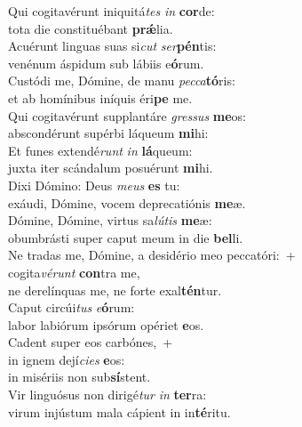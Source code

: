 \evenverse Qui cogitavérunt iniquitá\textit{tes} \textit{in} \textbf{cor}de:~\*\\
\evenverse tota die constituébant \textbf{prǽ}lia.\\
\oddverse Acuérunt linguas suas si\textit{cut} \textit{ser}\textbf{pén}tis:~\*\\
\oddverse venénum áspidum sub lábiis e\textbf{ó}rum.\\
\evenverse Custódi me, Dómine, de manu \textit{pec}\textit{ca}\textbf{tó}ris:~\*\\
\evenverse et ab homínibus iníquis éri\textbf{pe} me.\\
\oddverse Qui cogitavérunt supplantáre \textit{gres}\textit{sus} \textbf{me}os:~\*\\
\oddverse abscondérunt supérbi láqueum \textbf{mi}hi:\\
\evenverse Et funes extendé\textit{runt} \textit{in} \textbf{lá}queum:~\*\\
\evenverse juxta iter scándalum posuérunt \textbf{mi}hi.\\
\oddverse Dixi Dómino: Deus \textit{me}\textit{us} \textbf{es} tu:~\*\\
\oddverse exáudi, Dómine, vocem deprecatiónis \textbf{me}æ.\\
\evenverse Dómine, Dómine, virtus sa\textit{lú}\textit{tis} \textbf{me}æ:~\*\\
\evenverse obumbrásti super caput meum in die \textbf{bel}li.\\
\oddverse Ne tradas me, Dómine, a desidério meo peccatóri:~+\\
\oddverse  cogita\textit{vé}\textit{runt} \textbf{con}tra me,~\*\\
\oddverse ne derelínquas me, ne forte exal\textbf{tén}tur.\\
\evenverse Caput circúi\textit{tus} \textit{e}\textbf{ó}rum:~\*\\
\evenverse labor labiórum ipsórum opériet \textbf{e}os.\\
\oddverse Cadent super eos carbónes,~+\\
\oddverse  in ignem dejí\textit{ci}\textit{es} \textbf{e}os:~\*\\
\oddverse in misériis non sub\textbf{sí}stent.\\
\evenverse Vir linguósus non dirigé\textit{tur} \textit{in} \textbf{ter}ra:~\*\\
\evenverse virum injústum mala cápient in in\textbf{té}ritu.\\
